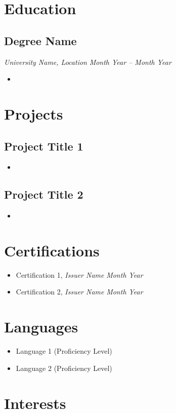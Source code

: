 \documentclass[a4paper,10pt]{article}
\begin{document}
\section*{Education}
\subsection*{Degree Name}
\textit{University Name, Location} \hfill \textit{Month Year -- Month Year}
\begin{itemize}[noitemsep]
    \item \lipsum[5][1-3]
\end{itemize}

\section*{Projects}
\subsection*{Project Title 1}
\begin{itemize}[noitemsep]
    \item \lipsum[6][1-3]
\end{itemize}

\subsection*{Project Title 2}
\begin{itemize}[noitemsep]
    \item \lipsum[7][1-3]
\end{itemize}

\section*{Certifications}
\begin{itemize}[noitemsep]
    \item Certification 1, \textit{Issuer Name} \hfill \textit{Month Year}
    \item Certification 2, \textit{Issuer Name} \hfill \textit{Month Year}
\end{itemize}

\section*{Languages}
\begin{itemize}[noitemsep]
    \item Language 1 (Proficiency Level)
    \item Language 2 (Proficiency Level)
\end{itemize}

\section*{Interests}
\lipsum[8][1-3]
\end{document}
